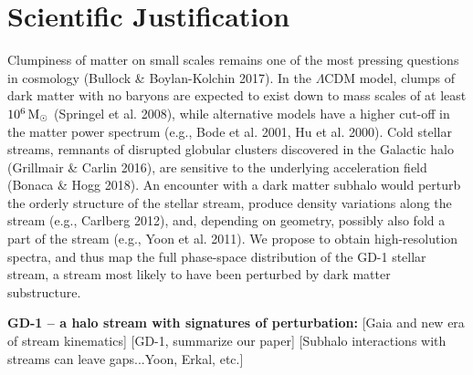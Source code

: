 \documentclass[12pt]{article}
\begin{document}
%
%
\section*{Scientific Justification}\vskip-0.2in


Clumpiness of matter on small scales remains one of the most pressing questions in cosmology (Bullock \& Boylan-Kolchin 2017).
In the $\Lambda$CDM model, clumps of dark matter with no baryons are expected to exist down to mass scales of at least $10^{6}\rm\,M_\odot$ (Springel et al. 2008), while alternative models have a higher cut-off in the matter power spectrum (e.g., Bode et al. 2001, Hu et al. 2000).
Cold stellar streams, remnants of disrupted globular clusters discovered in the Galactic halo (Grillmair \& Carlin 2016), are sensitive to the underlying acceleration field (Bonaca \& Hogg 2018).
An encounter with a dark matter subhalo would perturb the orderly structure of the stellar stream, produce density variations along the stream (e.g., Carlberg 2012), and, depending on geometry, possibly also fold a part of the stream (e.g., Yoon et al. 2011).
We propose to obtain high-resolution spectra, and thus map the full phase-space distribution of the GD-1 stellar stream, a stream most likely to have been perturbed by dark matter substructure.

% 


{\bf GD-1 -- a halo stream with signatures of perturbation:}
[Gaia and new era of stream kinematics]
[GD-1, summarize our paper]
[Subhalo interactions with streams can leave gaps...Yoon, Erkal, etc.]
\end{document}
